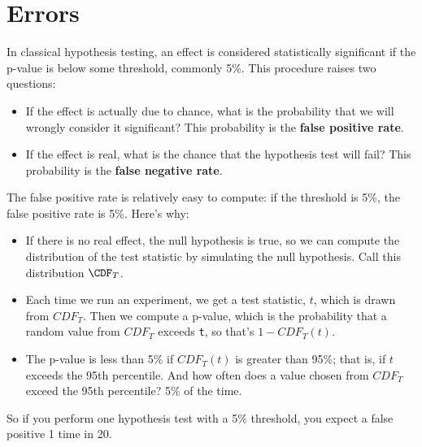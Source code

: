 \documentclass[12pt]{book}
\begin{document}
\section{Errors}

In classical hypothesis testing, an effect is considered statistically
significant if the p-value is below some threshold, commonly 5\%.
This procedure raises two questions:
 

\begin{itemize}

\item If the effect is actually due to chance, what is the probability
that we will wrongly consider it significant?  This
probability is the {\bf false positive rate}.

\item If the effect is real, what is the chance that the hypothesis
test will fail?  This probability is the {\bf false negative rate}.

\end{itemize}

The false positive rate is relatively easy to compute: if the
threshold is 5\%, the false positive rate is 5\%.  Here's why:

\begin{itemize}

\item If there is no real effect, the null hypothesis is true, so we
  can compute the distribution of the test statistic by simulating the
  null hypothesis.  Call this distribution $\CDF_T$.

\item Each time we run an experiment, we get a test statistic, $t$,
  which is drawn from $CDF_T$.  Then we compute a p-value, which is
  the probability that a random value from $CDF_T$ exceeds {\tt t},
  so that's $1 - CDF_T(t)$.

\item The p-value is less than 5\% if $CDF_T(t)$ is greater
  than 95\%; that is, if $t$ exceeds the 95th percentile.
  And how often does a value chosen from $CDF_T$ exceed
  the 95th percentile?  5\% of the time.

\end{itemize}

So if you perform one hypothesis test with a 5\% threshold, you expect
a false positive 1 time in 20.
\end{document}
